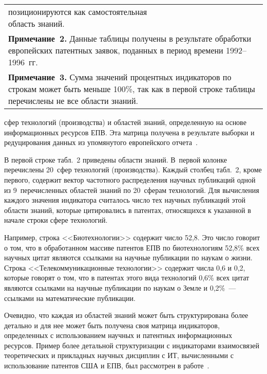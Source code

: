 \begin{table}
\begin{center}
\begin{tabular}{|l|c|c|c|c|c|c|c|c|c|}
{позиционируются как самостоятельная область знаний.}\\
   \multicolumn{10}{p{470pt}}{\footnotesize \textbf{Примечание~2.} Данные таблицы получены в результате 
обработки европейских патентных заявок, поданных в период времени 1992--1996~гг.}\\
   \multicolumn{10}{p{470pt}}{\footnotesize \textbf{Примечание~3.} Сумма значений процентных индикаторов по 
строкам может быть меньше 100\%, так как в первой строке таблицы перечислены не все области 
знаний.}
   \end{tabular}
   \end{center}
   \vspace*{9pt}
   \end{table}

\begin{multicols}{2}

\noindent
 сфер технологий 
(производства) и областей знаний, определенную на основе информационных ресурсов ЕПВ. 
Эта матрица получена в результате выборки и редуцирования данных из упомянутого 
европейского отчета~\cite{44-zat}.
  
  В первой строке табл.~2 приведены области знаний. В~первой колонке пе\-ре\-чис\-ле\-ны 
20~сфер технологий (производства). Каждый столбец табл.~2, кроме первого, содержит вектор 
частотного распре\-де\-ле\-ния научных публикаций одной из 
9~пе\-ре\-чис\-лен\-ных областей знаний по 
20~сферам технологий. Для вычисления каждого значения индикатора считалось число тех 
научных публикаций этой области знаний, которые цитировались в патентах, относящихся к 
указанной в начале строки сфере технологий.
  
  Например, строка <<Биотехнологии>> содержит число 52,8. Это число говорит о том, что в 
обработанном массиве патентов ЕПВ по биотехнологиям 52,8\% всех научных цитат являются 
ссылками на научные публикации по наукам о жизни. Строка <<Телекоммуникационные 
технологии>> содержит числа 0,6 и 0,2, которые говорят о том, что в патентах этого вида 
технологий 0,6\% всех цитат являются ссылками на научные публикации по наукам о Земле и 
0,2\%~--- ссылками на математические публикации.
  
  Очевидно, что каждая из областей знаний может быть структурирована более детально и для 
нее может быть получена своя матрица индикаторов, определенных с использованием научных 
и патентных информационных ресурсов. Пример более детальной структуризации с 
индикаторами взаимосвязей теоретических и прикладных научных дисциплин с ИТ, 
вычисленными с использование патентов США и ЕПВ, был рассмотрен в работе~\cite{46-zat}.
  

\end{multicols}
